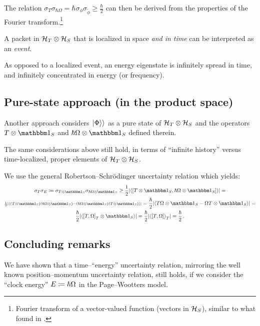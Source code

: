 The relation $\sigma_T\sigma_{\hbar\Omega} = \hbar \sigma_{\phi} \sigma_{\tilde{\phi}} \geq \frac{\hbar}{2}$
can then be derived from the properties of the Fourier transform.\footnote{
  Fourier transform of a
  vector-valued function
  (vectors in $\mathcal{H}_S$),
  similar to what found in \cite{Maccone:Pauli}.
}

A packet in $\mathcal{H}_T \otimes \mathcal{H}_S$ that is localized in space \emph{and in time} can be interpreted as an \emph{event}.

As opposed to a localized event, an energy eigenstate is infinitely spread in time,
and infinitely concentrated in energy (or frequency).

\subsection{Pure-state approach (in the product space)}\label{sec:pure-state-approach}

Another approach considers $\left.\left| \Phi \right\rangle\right\rangle$ as a pure state of $\mathcal{H}_T \otimes \mathcal{H}_S$
and the operators $\op{T} \ox \idop_{S}$ and $\hbar\op{\Omega} \ox \idop_{S}$
defined therein.

The same considerations above still hold, in terms of ``infinite history'' versus
time-localized, proper elements of $\mathcal{H}_T \otimes \mathcal{H}_S$. 

We use the general Robertson--Schr\"{o}dinger uncertainty relation which yields:
\begin{multline}
  \sigma_T \sigma_E \eqbydef
  \sigma_{T \ox \idop_S} \sigma_{\hbar\Omega \ox \idop_S} \geq
  \frac{1}{2} \abs{\expval{\comm
    {\op{T}\ox\idop_S} {\hbar\op{\Omega}\ox\idop_S}
  }} =
  \\
  {\scriptstyle
    \frac{1}{2} \abs{\expval{
      \qty(\op{T}\ox\idop_S) \qty(\hbar\op{\Omega}\ox\idop_S) -
      \qty(\hbar\op{\Omega}\ox\idop_S) \qty(\op{T}\ox\idop_S)
    }}
  } =
  \frac{\hbar}{2} \abs{\expval{
    \op{T}\op{\Omega}\ox\idop_S - \op{\Omega}\op{T}\ox\idop_S
  }} = \\
  \frac{\hbar}{2} \abs{\expval{
    \comm{\op{T}}{\op{\Omega}}_T \ox \idop_S
  }} =
  \frac{\hbar}{2} \abs{\expval{\comm
    {\op{T}}{\op{\Omega}}
  }_T} =
  \frac{\hbar}{2}
  \,\text{.}
\end{multline}

\subsection{Concluding remarks}

We have shown that a time--``energy'' uncertainty relation,
mirroring the well known position--momentum uncertainty relation,
still holds, if we consider the ``clock energy'' ${E} \coloneqq \hbar{\Omega}$
in the Page--Wootters model.

